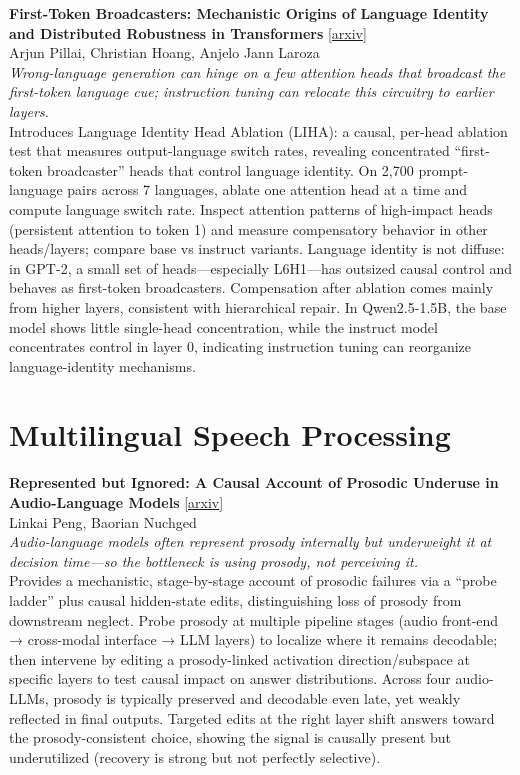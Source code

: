 \documentclass[12pt,letterpaper]{article}
\begin{document}
\medskip

{\small\textbf{First-Token Broadcasters: Mechanistic Origins of Language Identity and Distributed Robustness in Transformers}} {\scriptsize[\href{https://arxiv.org/abs/2606.22361}{arxiv}]}\\
{\scriptsize Arjun Pillai, Christian Hoang, Anjelo Jann Laroza}\\

{\small\textit{Wrong-language generation can hinge on a few attention heads that broadcast the first-token language cue; instruction tuning can relocate this circuitry to earlier layers.}}\\[1pt]
{\footnotesize Introduces Language Identity Head Ablation (LIHA): a causal, per-head ablation test that measures output-language switch rates, revealing concentrated ``first-token broadcaster'' heads that control language identity. On 2,700 prompt-language pairs across 7 languages, ablate one attention head at a time and compute language switch rate. Inspect attention patterns of high-impact heads (persistent attention to token 1) and measure compensatory behavior in other heads/layers; compare base vs instruct variants. Language identity is not diffuse: in GPT-2, a small set of heads---especially L6H1---has outsized causal control and behaves as first-token broadcasters. Compensation after ablation comes mainly from higher layers, consistent with hierarchical repair. In Qwen2.5-1.5B, the base model shows little single-head concentration, while the instruct model concentrates control in layer 0, indicating instruction tuning can reorganize language-identity mechanisms.}

\medskip


\section*{Multilingual Speech Processing}

{\small\textbf{Represented but Ignored: A Causal Account of Prosodic Underuse in Audio-Language Models}} {\scriptsize[\href{https://arxiv.org/abs/2608.19211}{arxiv}]}\\
{\scriptsize Linkai Peng, Baorian Nuchged}\\

{\small\textit{Audio-language models often represent prosody internally but underweight it at decision time---so the bottleneck is using prosody, not perceiving it.}}\\[1pt]
{\footnotesize Provides a mechanistic, stage-by-stage account of prosodic failures via a ``probe ladder'' plus causal hidden-state edits, distinguishing loss of prosody from downstream neglect. Probe prosody at multiple pipeline stages (audio front-end → cross-modal interface → LLM layers) to localize where it remains decodable; then intervene by editing a prosody-linked activation direction/subspace at specific layers to test causal impact on answer distributions. Across four audio-LLMs, prosody is typically preserved and decodable even late, yet weakly reflected in final outputs. Targeted edits at the right layer shift answers toward the prosody-consistent choice, showing the signal is causally present but underutilized (recovery is strong but not perfectly selective).}
\end{document}
